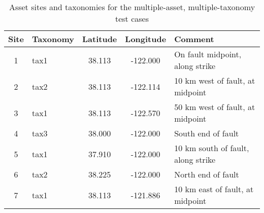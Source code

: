 \begin{table}

\centering
\begin{tabular}{ c l c c l }

\hline
\rowcolor{anti-flashwhite}
\bf{Site} & \bf{Taxonomy} & \bf{Latitude} & \bf{Longitude} & \bf{Comment} \\
\hline
1 & tax1 & 38.113 & -122.000 & On fault midpoint, along strike \\
2 & tax2 & 38.113 & -122.114 & 10 km west of fault, at midpoint \\
3 & tax1 & 38.113 & -122.570 & 50 km west of fault, at midpoint \\
4 & tax3 & 38.000 & -122.000 & South end of fault \\
5 & tax1 & 37.910 & -122.000 & 10 km south of fault, along strike \\
6 & tax2 & 38.225 & -122.000 & North end of fault \\
7 & tax1 & 38.113 & -121.886 & 10 km east of fault, at midpoint \\
\hline
\end{tabular}

\caption{Asset sites and taxonomies for the multiple-asset, multiple-taxonomy test cases}
\label{tab:assets-tax3}
\end{table}